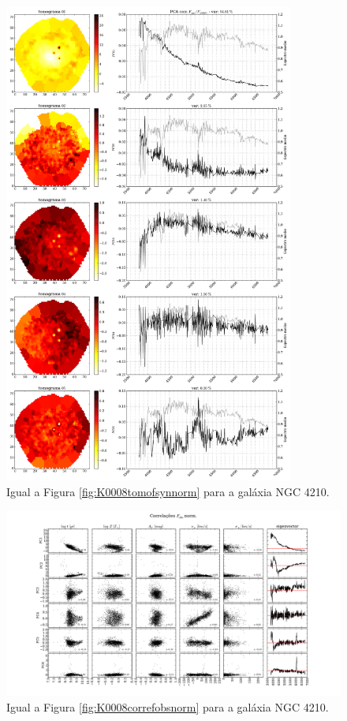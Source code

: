 \begin{figure}
    \includegraphics[width=0.85\textwidth]{figuras/K0518-tomo-syn-norm.pdf}
    \caption[Tomogramas de 1 a 5 para o cubo $F_{syn}$ norm. - NGC 4210.]
    {Igual a Figura \ref{fig:K0008tomofsynnorm} para a galáxia NGC 4210.}
    \label{fig:K0518tomofsynnorm}
\end{figure}

\begin{figure}
    \includegraphics[width=1.3\textwidth, angle=-90]{figuras/K0518-correl-f_obs_norm-PCvsPhys.pdf}
	\caption[Correlações PCs vs. par\^ametros f\'isicos - $F_{obs}$ norm. - NGC 4210.]
	{Igual a Figura \ref{fig:K0008correfobsnorm} para a galáxia NGC 4210.}
    \label{fig:K0518correfobsnorm}
\end{figure}

